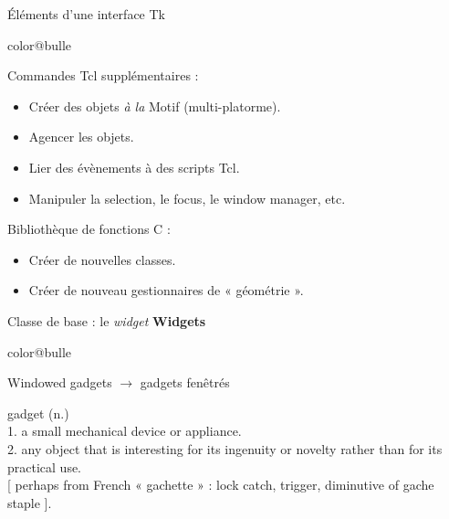 \documentclass[a4paper,landscape,smooth]{show}
\begin{document}
\begin{tslide}{Éléments d'une interface Tk}
   \vfill
   \begin{bitemize}{color@bulle}
      \item Commandes Tcl supplémentaires : 
	 \begin{itemize}
	    \item Créer des objets {\em à la} Motif (multi-platorme).
            \item Agencer les objets. 
            \item Lier des évènements à des scripts Tcl. 
            \item Manipuler la selection, le focus, le window manager,
		  etc. 
	 \end{itemize}

      \item Bibliothèque de fonctions C :
	 \begin{itemize}
	    \item Créer de nouvelles classes. 
	    \item Créer de nouveau gestionnaires de « géométrie ». 
	 \end{itemize}
   \end{bitemize}
   \vfill
\end{tslide}


\begin{tslide}{Classe de base : le {\em widget}}
   \vfill
   {\bf Widgets}
   \begin{bitemize}{color@bulle}
      \item Windowed gadgets $\rightarrow$ gadgets fenêtrés
      \item gadget (n.)\\
	 1. a small mechanical device or appliance.\\
	 2. any object that is interesting for its ingenuity or novelty
	    rather than for its practical use.\\

	 [ perhaps from French « gachette » : lock catch, trigger,
	    diminutive of gache staple ].
   \end{bitemize}
   \vfill
\end{tslide}

\end{document}

